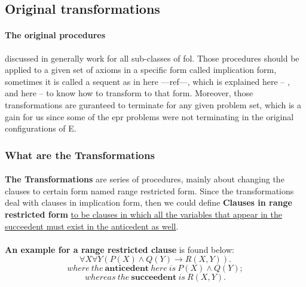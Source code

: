 \subsection{Original transformations}\label{sub:c3s1s1}
	\paragraph{The original procedures} discussed in \cite{BMUG06} generally work for all sub-classes of \ac{fol}. Those procedures should be applied to a given set of axioms in a specific form called implication form, sometimes it is called a sequent as in here ---ref---, which is explained here -- , and here -- to know how to transform to that form. Moreover, those transformations are guranteed to terminate for any given problem set, which is a gain for us since some of the \ac{epr} problems were not terminating in the original configurations of E.  

	\subsubsection{What are the Transformations}
	
		\paragraph{} 
		\textbf{The Transformations} are series of procedures, mainly about changing the clauses to certain form named range restricted form. Since the transformations deal with clauses in implication form, then we could define \textbf{Clauses in range restricted form} \ul{to be clauses in which all the variables that appear in the succeedent must exist in the anticedent as well}.
	
		\paragraph{} 
		\textbf{An example for a range restricted clause} is found below:\newline
			\begin{displaymath}
				\forall X \forall Y  \left( P(X) \wedge Q(Y) \longrightarrow R(X, Y) \right).
			\end{displaymath}
			\begin{displaymath}
				where \: the \: \textbf{anticedent} \: here \: is \: P(X) \wedge Q(Y);
 			\end{displaymath}
			\begin{displaymath}
				whereas \: the \: \textbf{succeedent} \: is \: R(X, Y).
 			\end{displaymath}
		
